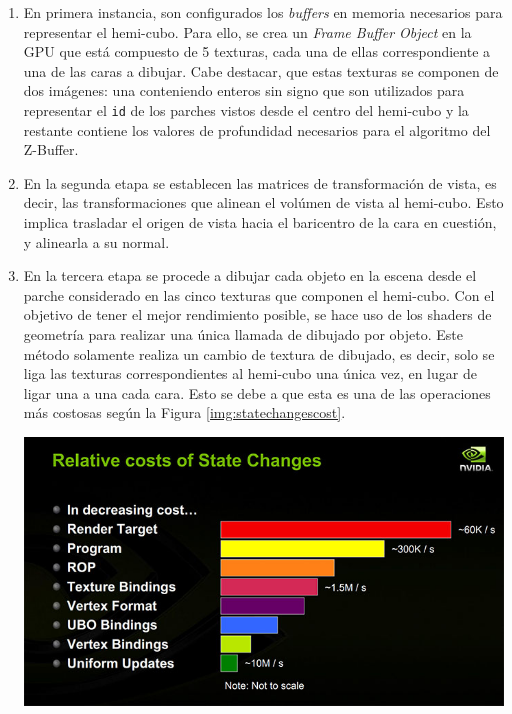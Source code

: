 \begin{enumerate}
	\item En primera instancia, son configurados los \textit{buffers} en memoria necesarios para representar el hemi-cubo.
	Para ello, se crea un \textit{Frame Buffer Object} en la GPU que está compuesto de 5 texturas, cada una de ellas correspondiente a una de las caras a dibujar. Cabe destacar, que estas texturas se componen de dos imágenes: una conteniendo enteros sin signo que son utilizados para representar el \verb|id| de los parches vistos desde el centro del hemi-cubo y la restante contiene los valores de profundidad necesarios para el algoritmo del Z-Buffer.
	\item En la segunda etapa se establecen las matrices de transformación de vista, es decir, las transformaciones que alinean el volúmen de vista al hemi-cubo. Esto implica trasladar el origen de vista hacia el baricentro de la cara en cuestión, y alinearla a su normal.
	\item En la tercera etapa se procede a dibujar cada objeto en la escena desde el parche considerado en las cinco texturas que componen el hemi-cubo. Con el objetivo de tener el mejor rendimiento posible, se hace uso de los shaders de geometría para realizar una única llamada de dibujado por objeto. Este método solamente realiza un cambio de textura de dibujado, es decir, solo se liga las texturas correspondientes al hemi-cubo una única vez, en lugar de ligar una a una cada cara. Esto se debe a que esta es una de las operaciones más costosas según la Figura \ref{img:statechangescost}. 
	
	\vspace{10mm}
	\begin{minipage}[htbp]{\linewidth}
		\centering
		\includegraphics[width=0.6\linewidth]{assets/statecosts}
		\label{img:statechangescost}
	\end{minipage}
	\vspace{10mm}


\end{enumerate}
